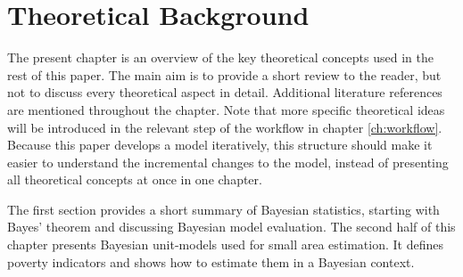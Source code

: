 \chapter{Theoretical Background}
The present chapter is an overview of the key theoretical concepts used in the rest of this paper.
The main aim is to provide a short review to the reader, but not to discuss every theoretical aspect in detail.
Additional literature references are mentioned throughout the chapter.
Note that more specific theoretical ideas will be introduced in the relevant step of the workflow in chapter \ref{ch:workflow}.
Because this paper develops a model iteratively, this structure should make it easier to understand the incremental changes to the model, instead of presenting all theoretical concepts at once in one chapter.

The first section provides a short summary of Bayesian statistics, starting with Bayes' theorem and discussing Bayesian model evaluation.
The second half of this chapter presents Bayesian unit-models used for small area estimation.
It defines poverty indicators and shows how to estimate them in a Bayesian context.




